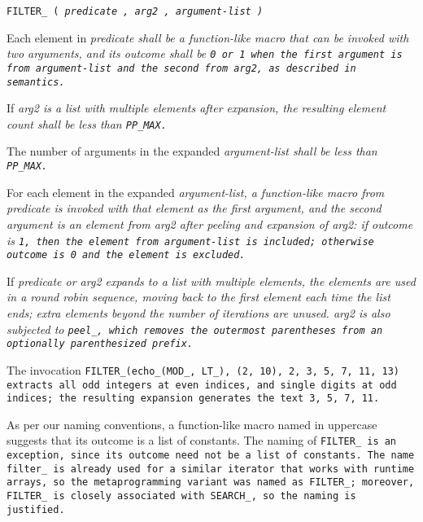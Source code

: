 
\tt{FILTER_ (} \it{predicate} \tt{,} \it{arg2} \tt{,} \it{argument-list} \tt{)}


Each element in \it{predicate} shall be a function-like macro that can be
invoked with two arguments, and its outcome shall be \tt{0} or \tt{1} when
the first argument is from \it{argument-list} and the second from \it{arg2},
as described in semantics.

If \it{arg2} is a list with multiple elements after expansion,
the resulting element count shall be less than \tt{PP_MAX}.

The number of arguments in the expanded
\it{argument-list} shall be less than \tt{PP_MAX}.


For each element in the expanded \it{argument-list}, a function-like macro
from \it{predicate} is invoked with that element as the first argument, and
the second argument is an element from \it{arg2} after peeling and expansion
of \it{arg2}: if outcome is \tt{1}, then the element from \it{argument-list}
is included; otherwise outcome is \tt{0} and the element is excluded.

If \it{predicate} or \it{arg2} expands to a list with multiple elements, the
elements are used in a round robin sequence, moving back to the first element each
time the list ends; extra elements beyond the number of iterations are unused.
\it{arg2} is also subjected to \tt{peel_}, which removes the
outermost parentheses from an optionally parenthesized prefix.

\example The invocation \tt{FILTER_(echo_(MOD_, LT_), (2, 10), 2, 3, 5, 7, 11, 13)}
extracts all odd integers at even indices, and single digits at odd indices;
the resulting expansion generates the text \tt{3, 5, 7, 11}.

\note As per our naming conventions, a function-like macro named
in uppercase suggests that its outcome is a list of constants.
The naming of \tt{FILTER_} is an exception,
since its outcome need not be a list of constants.
The name \tt{filter_} is already used for a similar iterator that works with
runtime arrays, so the metaprogramming variant was named as \tt{FILTER_};
moreover, \tt{FILTER_} is closely associated with \tt{SEARCH_},
so the naming is justified.
